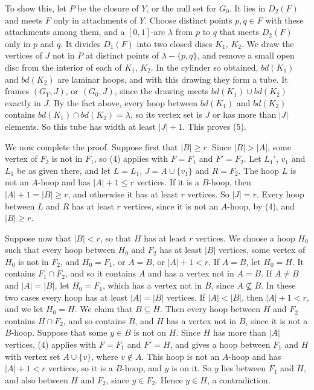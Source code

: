 {To show this, let $P$ be the closure of $Y$, or the null set for $G_0$. It lies in $D_2(F)$ and meets $F$ only in attachments of $Y$. Choose distinct points $p, q \in F$ with these attachments among them, and a $[0,1]$-arc $\lambda$ from $p$ to $q$ that meets $D_2(F)$ only in $p$ and $q$. It divides $D_1(F)$ into two closed discs $K_1$, $K_2$. We draw the vertices of $J$ not in $P$ at distinct points of $\lambda - \{p, q\}$, and remove a small open disc from the interior of each of $K_1$, $K_2$. In the cylinder so obtained, $bd(K_1)$ and $bd(K_2)$ are laminar hoops, and with this drawing they form a tube. It frames $(G_Y, J)$, or $(G_0, J)$, since the drawing meets $bd(K_1) \cup bd(K_2)$ exactly in $J$. By the fact above, every hoop between $bd(K_1)$ and $bd(K_2)$ contains $bd(K_1) \cap bd(K_2) = \lambda$, so its vertex set is $J$ or has more than $|J|$ elements. So this tube has width at least $|J| + 1$. This proves (5).

We now complete the proof. Suppose first that $|B| \ge r$. Since $|B| > |A|$, some vertex of $F_2$ is not in $F_1$, so (4) applies with $F = F_1$ and $F' = F_2$. Let $L_1'$, $v_1$ and $L_1$ be as given there, and let $L = L_1$, $J = A \cup \{v_1\}$ and $R = F_2$. The hoop $L$ is not an $A$-hoop and has $|A| + 1 \le r$ vertices. If it is a $B$-hoop, then $|A| + 1 = |B| \ge r$, and otherwise it has at least $r$ vertices. So $|J| = r$. Every hoop between $L$ and $R$ has at least $r$ vertices, since it is not an $A$-hoop, by (4), and $|B| \ge r$.

Suppose now that $|B| < r$, so that $H$ has at least $r$ vertices. We choose a hoop $H_0$ such that every hoop between $H_0$ and $F_2$ has at least $|B|$ vertices, some vertex of $H_0$ is not in $F_2$, and $H_0 = F_1$, or $A = B$, or $|A| + 1 < r$. If $A = B$, let $H_0 = H$. It contains $F_1 \cap F_2$, and so it contains $A$ and has a vertex not in $A = B$. If $A \ne B$ and $|A| = |B|$, let $H_0 = F_1$, which has a vertex not in $B$, since $A \not\subseteq B$. In these two cases every hoop has at least $|A| = |B|$ vertices. If $|A| < |B|$, then $|A| + 1 < r$, and we let $H_0 = H$. We claim that $B \subseteq H$. Then every hoop between $H$ and $F_2$ contains $H \cap F_2$, and so contains $B$, and $H$ has a vertex not in $B$, since it is not a $B$-hoop. Suppose that some $y \in B$ is not on $H$. Since $H$ has more than $|A|$ vertices, (4) applies with $F = F_1$ and $F' = H$, and gives a hoop between $F_1$ and $H$ with vertex set $A \cup \{v\}$, where $v \notin A$. This hoop is not an $A$-hoop and has $|A| + 1 < r$ vertices, so it is a $B$-hoop, and $y$ is on it. So $y$ lies between $F_1$ and $H$, and also between $H$ and $F_2$, since $y \in F_2$. Hence $y \in H$, a contradiction.

}
